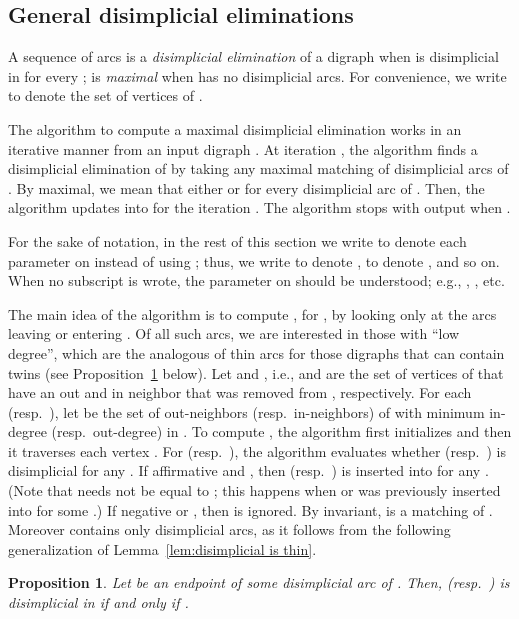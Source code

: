 \documentclass[a4paper,11pt]{article}
\newtheorem{proposition}[theorem]{Proposition}
\begin{document}
\subsection{General disimplicial eliminations}

A sequence of arcs  is a \emph{disimplicial elimination} of a digraph  when  is disimplicial in  for every ;  is \emph{maximal} when  has no disimplicial arcs.  For convenience, we write  to denote the set of vertices of .  

The algorithm to compute a maximal disimplicial elimination works in an iterative manner from an input digraph .  At iteration , the algorithm finds a disimplicial elimination  of  by taking any maximal matching of disimplicial arcs of .  By maximal, we mean that either  or  for every disimplicial arc  of .  Then, the algorithm updates  into  for the iteration .  The algorithm stops with output  when .  

For the sake of notation, in the rest of this section we write  to denote each parameter  on  instead of using ; thus, we write  to denote ,  to denote , and so on.  When no subscript is wrote, the parameter on  should be understood; e.g., , , etc. 

The main idea of the algorithm is to compute , for , by looking only at the arcs leaving or entering .  Of all such arcs, we are interested in those with ``low degree'', which are the analogous of thin arcs for those digraphs that can contain twins (see Proposition~\ref{prop:disimplicial in L} below).   Let  and , i.e.,  and  are the set of vertices of  that have an out and in neighbor that was removed from , respectively. For each  (resp.\ ), let  be the set of out-neighbors (resp.\ in-neighbors) of  with minimum in-degree (resp.\ out-degree) in .  To compute , the algorithm first initializes  and then it traverses each vertex .  For  (resp.\ ), the algorithm evaluates whether  (resp.\ ) is disimplicial for any .  If affirmative and , then  (resp.\ ) is inserted into  for any .  (Note that  needs not be equal to ; this happens when  or  was previously inserted into  for some .) If negative or , then  is ignored.  By invariant,  is a matching of .  Moreover  contains only disimplicial arcs, as it follows from the following generalization of Lemma~\ref{lem:disimplicial is thin}.  

\begin{proposition}\label{prop:disimplicial in L}
  Let  be an endpoint of some disimplicial arc of .  Then,  (resp.\ ) is disimplicial in  if and only if .
\end{proposition}
\end{document}
